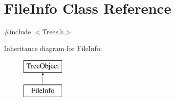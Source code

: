 \hypertarget{class_file_info}{}\section{File\+Info Class Reference}
\label{class_file_info}


{\ttfamily \#include $<$Trees.\+h$>$}

Inheritance diagram for File\+Info\+:\begin{figure}[H]
\begin{center}
\leavevmode
\includegraphics[height=2.000000cm]{class_file_info}
\end{center}
\end{figure}
